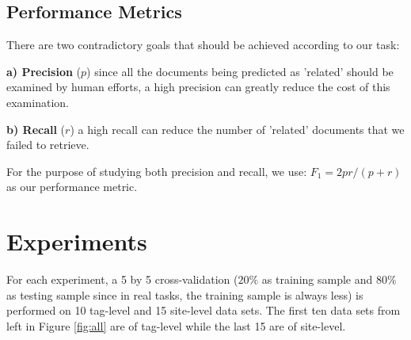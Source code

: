 \documentclass{sig-alternate-05-2015}
\begin{document}
\subsection{Performance Metrics}


There are two contradictory goals that should be achieved according to our task: 

\textbf{a) Precision} ($p$) since all the documents being predicted as 'related' should be examined by human efforts, a high precision can greatly reduce the cost of this examination.

\textbf{b) Recall} ($r$) a high recall can reduce the number of 'related' documents that we failed to retrieve.

For the purpose of studying both precision and recall, we use:
 \mbox{$F_{1}=  2pr/(p+r)$}
as  our  performance metric.

\section{Experiments}
\label{sect:Experiment}



For each experiment, a 5 by 5 cross-validation ($20\%$ as training sample and $80\%$ as testing sample since in real tasks, the training sample is always less) is performed on 10 tag-level and 15 site-level data sets. The first ten data sets from left in Figure \ref{fig:all} are of tag-level while the last 15 are of site-level.
\end{document}

